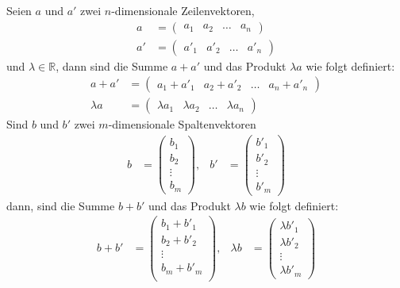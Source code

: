 \begin{definition}
Seien $a$ und $a'$ zwei $n$-dimensionale Zeilenvektoren,
\begin{align*}
a&=\begin{pmatrix}a_1&a_2&\dots&a_n\end{pmatrix}
\\
a'&=\begin{pmatrix}a'_1&a'_2&\dots&a'_n\end{pmatrix}
\end{align*}
und $\lambda\in\mathbb R$, dann sind die Summe $a+a'$ und das
Produkt $\lambda a$ wie folgt definiert:
\begin{align*}
a+a'&=\begin{pmatrix}a_1+a'_1&a_2+a'_2&\dots&a_n+a'_n\end{pmatrix}
\\
\lambda a&=\begin{pmatrix}\lambda a_1&\lambda a_2&\dots&\lambda a_n\end{pmatrix}
\end{align*}
Sind $b$ und $b'$ zwei $m$-dimensionale Spaltenvektoren
\begin{align*}
b&=\begin{pmatrix}b_1\\b_2\\\vdots\\b_m\end{pmatrix},
&
b'&=\begin{pmatrix}b'_1\\b'_2\\\vdots\\b'_m\end{pmatrix}
\end{align*}
dann, sind die Summe $b+b'$ und das Produkt $\lambda b$ wie folgt 
definiert:
\begin{align*}
b+b'&=\begin{pmatrix}
b_1+b'_1\\
b_2+b'_2\\
\vdots\\
b_m+b'_m\\
\end{pmatrix},
&
\lambda b&=\begin{pmatrix}
\lambda b'_1\\
\lambda b'_2\\
\vdots\\
\lambda b'_m
\end{pmatrix}
\end{align*}
\end{definition}
